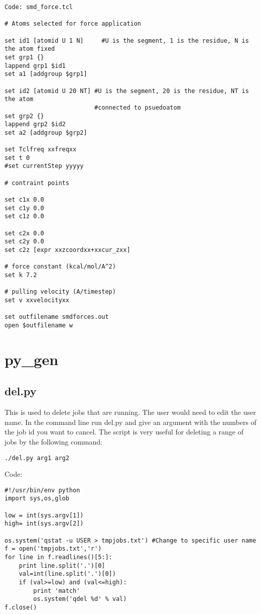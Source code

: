 \documentclass[11pt]{article}
\begin{document}
\begin{verbatim}
Code: smd_force.tcl

# Atoms selected for force application 

set id1 [atomid U 1 N]     #U is the segment, 1 is the residue, N is the atom fixed
set grp1 {}
lappend grp1 $id1
set a1 [addgroup $grp1]

set id2 [atomid U 20 NT] #U is the segment, 20 is the residue, NT is the atom 
                         #connected to psuedoatom
set grp2 {}
lappend grp2 $id2
set a2 [addgroup $grp2]

set Tclfreq xxfreqxx
set t 0
#set currentStep yyyyy

# contraint points

set c1x 0.0
set c1y 0.0
set c1z 0.0

set c2x 0.0
set c2y 0.0
set c2z [expr xxzcoordxx+xxcur_zxx]

# force constant (kcal/mol/A^2)
set k 7.2

# pulling velocity (A/timestep)
set v xxvelocityxx

set outfilename smdforces.out
open $outfilename w
\end{verbatim}

\section{py\_gen}


\subsection{del.py}
This is used to delete jobs that are running. The user would need to edit the user name. In the command line run del.py and give an argument with the numbers of the job id you want to cancel. The script is very useful for deleting a range of jobs by the following command: 
\begin{verbatim}
./del.py arg1 arg2
\end{verbatim}
Code:
\begin{verbatim}
#!/usr/bin/env python
import sys,os,glob

low = int(sys.argv[1])
high= int(sys.argv[2])

os.system('qstat -u USER > tmpjobs.txt') #Change to specific user name
f = open('tmpjobs.txt','r')
for line in f.readlines()[5:]:
    print line.split('.')[0]
    val=int(line.split('.')[0])
    if (val>=low) and (val<=high):
        print 'match'
        os.system('qdel %d' % val)
f.close()
\end{verbatim}
\end{document}
